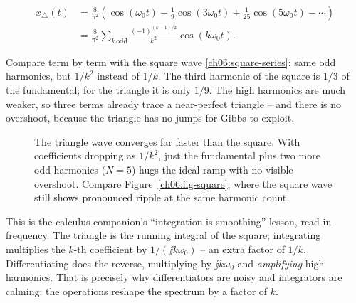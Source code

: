 \begin{align}
x_{\triangle}(t) &= \frac{8}{\pi^2}\left(\cos(\omega_0 t) - \frac1{9}\cos(3\omega_0 t) + \frac1{25}\cos(5\omega_0 t) - \cdots\right) \nonumber\\
&= \frac{8}{\pi^2}\sum_{k\,\text{odd}} \frac{(-1)^{(k-1)/2}}{k^2}\cos(k\omega_0 t).
\label{ch06:triangle}
\end{align}

Compare term by term with the square wave \eqref{ch06:square-series}: same odd harmonics,
but \(1/k^2\) instead of \(1/k\). The third harmonic of the square is \(1/3\) of the
fundamental; for the triangle it is only \(1/9\). The high harmonics are much weaker, so
three terms already trace a near-perfect triangle -- and there is no overshoot, because
the triangle has no jumps for Gibbs to exploit.

\begin{figure}[H]
\centering
{}
\caption{The triangle wave converges far faster than the square. With coefficients dropping
as $1/k^2$, just the fundamental plus two more odd harmonics ($N=5$) hugs the ideal ramp
with no visible overshoot. Compare Figure~\ref{ch06:fig-square}, where the square wave still
shows pronounced ripple at the same harmonic count.}
\label{ch06:fig-triangle}
\end{figure}

\begin{connectionbox}
This is the calculus companion's ``integration is smoothing'' lesson, read in frequency.
The triangle is the running integral of the square; integrating multiplies the \(k\)-th
coefficient by \(1/(\jj k\omega_0)\) -- an extra factor of \(1/k\). Differentiating does
the reverse, multiplying by \(\jj k\omega_0\) and \emph{amplifying} high harmonics. That
is precisely why differentiators are noisy and integrators are calming: the operations
reshape the spectrum by a factor of \(k\).
\end{connectionbox}

